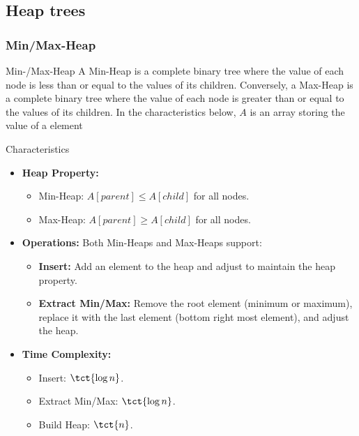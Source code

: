 \newpage
\subsection{Heap trees}
\label{sec:heap-trees}
\subsubsection{Min/Max-Heap}
\begin{definition}[]{Min-/Max-Heap}
    A Min-Heap is a complete binary tree where the value of each node is less than or equal to the values of its children.
    Conversely, a Max-Heap is a complete binary tree where the value of each node is greater than or equal to the values of its children.
    In the characteristics below, $A$ is an array storing the value of a element
\end{definition}

\begin{properties}[]{Characteristics}
    \begin{itemize}
        \item \textbf{Heap Property:}
              \begin{itemize}
                  \item Min-Heap: $A[parent] \leq A[child]$ for all nodes.
                  \item Max-Heap: $A[parent] \geq A[child]$ for all nodes.
              \end{itemize}
        \item \textbf{Operations:} Both Min-Heaps and Max-Heaps support:
              \begin{itemize}
                  \item \textbf{Insert:} Add an element to the heap and adjust to maintain the heap property.
                  \item \textbf{Extract Min/Max:} Remove the root element (minimum or maximum), replace it with the last element (bottom right most element), and adjust the heap.
              \end{itemize}
        \item \textbf{Time Complexity:}
              \begin{itemize}
                  \item Insert: $\tct{\log n}$.
                  \item Extract Min/Max: $\tct{\log n}$.
                  \item Build Heap: $\tct{n}$.
              \end{itemize}
    \end{itemize}
\end{properties}

